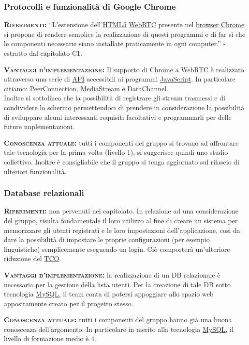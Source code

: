 \subsubsection{Protocolli e funzionalità di Google Chrome}
\begin{description}
	\item{\scshape\bfseries Riferimenti:}
  ``L'estensione dell'\underline{HTML5} \underline{WebRTC} presente nel \underline{browser} \underline{Chrome} si propone di rendere semplice la realizzazione di questi programmi e di far sì che le componenti necessarie siano installate praticamente in ogni computer.'' - estratto dal capitolato C1.
  
 	\item{\scshape\bfseries Vantaggi d'implementazione:} Il supporto di \underline{Chrome} a \underline{WebRTC} è realizzato attraverso una serie di \underline{API} accessibili ai programmi \underline{JavaScript}. In particolare citiamo: PeerConnection, MediaStream e DataChannel.\\Inoltre si sottolinea che la possibilità di registrare gli stream trasmessi e di condividere lo schermo permettendoci di prendere in considerazione la possibilità di sviluppare alcuni interessanti requisiti facoltativi e programmarli per delle future implementazioni.
	
	\item{\scshape\bfseries Conoscenza attuale:} tutti i componenti del gruppo si trovano ad affrontare tale tecnologia per la prima volta (livello 1), si suggerisce quindi uno studio collettivo. Inoltre è consigliabile che il gruppo si tenga aggiornato sul rilascio di ulteriori funzionalità.
\end{description}

\subsubsection{Database relazionali}
\begin{description}
	\item{\scshape\bfseries Riferimenti:} non pervenuti nel capitolato. In relazione ad una considerazione del gruppo, risulta fondamentale il loro utilizzo al fine di creare un sistema per memorizzare gli utenti registrati e le loro impostazioni dell'applicazione, cosi da dare la possibilità di impostare le proprie configurazioni (per esempio linguistiche) semplicemente eseguendo un login. Ciò comporterà un'ulteriore riduzione del \underline{TCO}.
  
 	\item{\scshape\bfseries Vantaggi d'implementazione:} la realizzazione di un DB relazionale è necessaria per la gestione della lista utenti. Per la creazione di tale DB sotto tecnologia \underline{MySQL}, il team conta di potersi appoggiare allo spazio web appositamente creato per il progetto stesso.
	
	\item{\scshape\bfseries Conoscenza attuale:} tutti i componenti del gruppo hanno già una buona conoscenza dell'argomento. In particolare in merito alla tecnologia \underline{MySQL}, il livello di formazione medio è 4.
\end{description}

